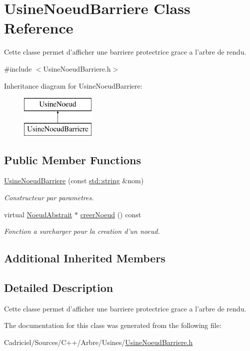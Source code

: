 \hypertarget{class_usine_noeud_barriere}{\section{Usine\-Noeud\-Barriere Class Reference}
\label{class_usine_noeud_barriere}
}


Cette classe permet d'afficher une barriere protectrice grace a l'arbre de rendu.  




{\ttfamily \#include $<$Usine\-Noeud\-Barriere.\-h$>$}

Inheritance diagram for Usine\-Noeud\-Barriere\-:\begin{figure}[H]
\begin{center}
\leavevmode
\includegraphics[height=2.000000cm]{class_usine_noeud_barriere}
\end{center}
\end{figure}
\subsection*{Public Member Functions}
\begin{DoxyCompactItemize}
\item 
\hyperlink{group__inf2990_ga0ec1e3a0fbfbc601eb2bafd5c9e207f0}{Usine\-Noeud\-Barriere} (const \hyperlink{glew_8h_ae84541b4f3d8e1ea24ec0f466a8c568b}{std\-::string} \&nom)
\begin{DoxyCompactList}\small\item\em Constructeur par parametres. \end{DoxyCompactList}\item 
virtual \hyperlink{class_noeud_abstrait}{Noeud\-Abstrait} $\ast$ \hyperlink{group__inf2990_ga4ff463b2444d5e81b54c6c3200c74136}{creer\-Noeud} () const 
\begin{DoxyCompactList}\small\item\em Fonction a surcharger pour la creation d'un noeud. \end{DoxyCompactList}\end{DoxyCompactItemize}
\subsection*{Additional Inherited Members}


\subsection{Detailed Description}
Cette classe permet d'afficher une barriere protectrice grace a l'arbre de rendu. 

The documentation for this class was generated from the following file\-:\begin{DoxyCompactItemize}
\item 
Cadriciel/\-Sources/\-C++/\-Arbre/\-Usines/\hyperlink{_usine_noeud_barriere_8h}{Usine\-Noeud\-Barriere.\-h}\end{DoxyCompactItemize}
